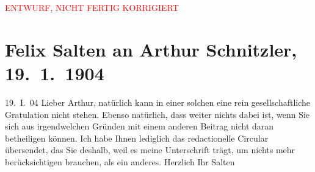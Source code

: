 
\begin{center}
            \textcolor{red}{ENTWURF, NICHT FERTIG KORRIGIERT}
                      \end{center}
            
         \renewcommand{\erwaehnteOrte}{Orte: Wien}
         \renewcommand{\erwaehnteWerke}{}
               \section[Felix Salten an Arthur Schnitzler, 19. 1. 1904]{ Felix Salten an Arthur Schnitzler, 19. 1. 1904}\nopagebreak{}\rehead{ }\begin{ledgroupsized}[t]{13cm}\normalsize\beginnumbering \toendnotes[C]{\smallbreak\pagebreak[2]} 
\toendnotes[C]{\smallbreak}\pstart
           \raggedleft{}{\pb}19. I. 04\pend
           \pstart
           Lieber Arthur, natürlich kann in einer solchen \label{K_L03391-1v}\label{K_L03391-1h} eine rein gesellschaftliche Gratulation nicht
               stehen. Ebenso natürlich, dass weiter nichts dabei ist, wenn Sie sich aus
               irgendwelchen Gründen mit einem anderen Beitrag nicht daran betheiligen können. Ich
               habe Ihnen lediglich das redactionelle Circular übersendet, das Sie deshalb, weil es
               meine Unterschrift trägt, um nichts mehr berücksichtigen brauchen, als ein anderes. \pend
           \pstart Herzlich Ihr \spacefill\mbox{Salten}\pend{}
         
         \endnumbering{}\end{ledgroupsized}\begin{anhang}\end{anhang}\newcommand{\dateiname}{L03391}\newcommand{\titel}{Felix Salten an Arthur Schnitzler, 19. 1. 1904}\newcommand{\editorInnen}{Martin Anton Müller und Laura Untner}
      